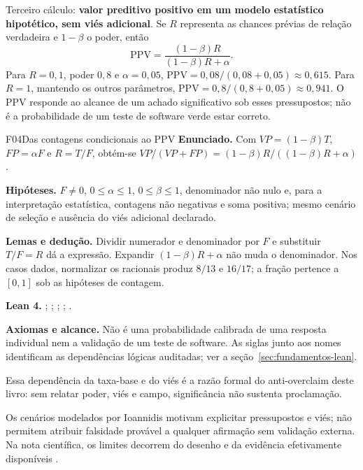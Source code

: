 Terceiro cálculo: \textbf{valor preditivo positivo em um modelo estatístico
hipotético, sem viés adicional}. Se $R$ representa as chances prévias de
relação verdadeira e $1-\beta$ o poder, então
\[ \mathrm{PPV}=\frac{(1-\beta)R}{(1-\beta)R+\alpha}. \]
Para $R=0{,}1$, poder $0{,}8$ e $\alpha=0{,}05$,
$\mathrm{PPV}=0{,}08/(0{,}08+0{,}05)\approx0{,}615$.
Para $R=1$, mantendo os outros parâmetros,
$\mathrm{PPV}=0{,}8/(0{,}8+0{,}05)\approx0{,}941$.
O PPV responde ao alcance de um achado significativo sob esses pressupostos;
não é a probabilidade de um teste de software verde estar correto.
\begin{formalizacao}{F04}{Das contagens condicionais ao PPV}
\textbf{Enunciado.} Com $VP=(1-\beta)T$, $FP=\alpha F$ e $R=T/F$, obtém-se $VP/(VP+FP)=(1-\beta)R/((1-\beta)R+\alpha)$.

\textbf{Hipóteses.} $F\ne0$, $0\leq\alpha\leq1$, $0\leq\beta\leq1$, denominador não nulo e, para a interpretação estatística, contagens não negativas e soma positiva; mesmo cenário de seleção e ausência do viés adicional declarado.

\textbf{Lemas e dedução.} Dividir numerador e denominador por $F$ e substituir $T/F=R$ dá a expressão. Expandir $(1-\beta)R+\alpha$ não muda o denominador. Nos casos dados, normalizar os racionais produz $8/13$ e $16/17$; a fração pertence a $[0,1]$ sob as hipóteses de contagem.

\textbf{Lean 4.} ; ; ; ; .

\textbf{Axiomas e alcance.} Não é uma probabilidade calibrada de uma resposta individual nem a validação de um teste de software. As siglas junto aos nomes identificam as dependências lógicas auditadas; ver a seção~\ref{sec:fundamentos-lean}.
\end{formalizacao}


Essa depend\^encia da taxa-base e do vi\'es \'e a raz\~ao formal do anti-overclaim deste livro: sem relatar poder, vi\'es e campo, signific\^ancia n\~ao sustenta proclama\c{c}\~ao.

Os cenários modelados por Ioannidis motivam explicitar pressupostos e viés;
não permitem atribuir falsidade provável a qualquer afirmação sem validação
externa. Na nota científica, os limites decorrem do desenho e da evidência
efetivamente disponíveis .

